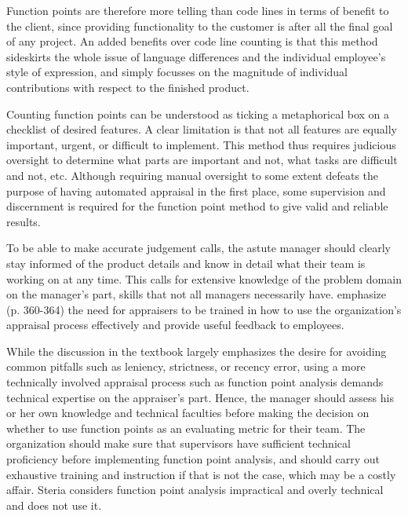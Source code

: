 \documentclass[letterpaper, 12pt]{report}
\begin{document}
Function points are therefore more telling than code lines in terms of benefit to the client, since providing functionality to the customer is after all the final goal of any project.
An added benefits over code line counting is that this method sideskirts the whole issue of language differences and the individual employee's style of expression, and simply focusses on the magnitude of individual contributions with respect to the finished product. 

Counting function points can be understood as ticking a metaphorical box on a checklist of desired features. 
A clear limitation is that not all features are equally important, urgent, or difficult to implement. 
This method thus requires judicious oversight to determine what parts are important and not, what tasks are difficult and not, etc.
Although requiring manual oversight to some extent defeats the purpose of having automated appraisal in the first place, some supervision and discernment is required for the function point method to give valid and reliable results. 

To be able to make accurate judgement calls, the astute manager should clearly stay informed of the product details and know in detail what their team is working on at any time.
This calls for extensive knowledge of the problem domain on the manager's part, skills that not all managers necessarily have.
\textcite{textbook} emphasize (p. 360-364) the need for appraisers to be trained in how to use the organization's appraisal process effectively and provide useful feedback to employees.

While the discussion in the textbook largely emphasizes the desire for avoiding common pitfalls such as leniency, strictness, or recency error, using a more technically involved appraisal process such as function point analysis demands technical expertise on the appraiser's part.
Hence, the manager should assess his or her own knowledge and technical faculties before making the decision on whether to use function points as an evaluating metric for their team.
The organization should make sure that supervisors have sufficient technical proficiency before implementing function point analysis, and should carry out exhaustive training and instruction if that is not the case, which may be a costly affair.
Steria considers function point analysis impractical and overly technical and does not use it.



\end{document}
